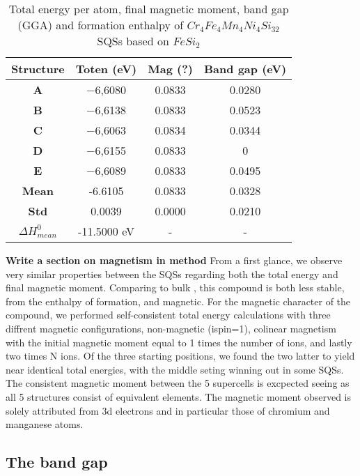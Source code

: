 \begin{table}[H]
\centering
\begin{tabular}{@{}cccc@{}}
\toprule
Structure  & Toten (eV) & Mag (?) & Band gap (eV) \\ \midrule
\textbf{A} & −6,6080                & 0.0833                    & 0.0280        \\
\textbf{B} & −6,6138                & 0.0833                    & 0.0523        \\
\textbf{C} & −6,6063                & 0.0834                    & 0.0344        \\
\textbf{D} & −6,6155                & 0.0833                    & 0             \\
\textbf{E} & −6,6089                & 0.0833                    & 0.0495        \\ \midrule
\textbf{Mean} & -6.6105 & 0.0833 & 0.0328    \\
\textbf{Std} & 0.0039 &  0.0000 &  0.0210 \\
\textbf{$\Delta H_{mean}^0$} & -11.5000 eV & - & - \\ \bottomrule
\end{tabular}
\caption{Total energy per atom, final magnetic moment, band gap (GGA) and formation enthalpy of $Cr_4Fe_4Mn_4Ni_4Si_{32}$ SQSs based on $FeSi_2$}
\label{table:fesi2_summary}
\end{table}  

\textbf{Write a section on magnetism in method}
From a first glance, we observe very similar properties between the SQSs regarding both the total energy and final magnetic moment. Comparing to bulk , this compound is both less stable, from the enthalpy of formation, and magnetic. For the magnetic character of the compound, we performed self-consistent total energy calculations with three diffrent magnetic configurations, non-magnetic (ispin=1), colinear magnetism with the initial magnetic moment equal to 1 times the number of ions, and lastly two times N ions. Of the three starting positions, we found the two latter to yield near identical total energies, with the middle seting winning out in some SQSs. The consistent magnetic moment between the 5 supercells is excpected seeing as all 5 structures consist of equivalent elements. The magnetic moment observed is solely attributed from 3d electrons and in particular those of chromium and manganese atoms. 
 
\subsection{The band gap} 
 
